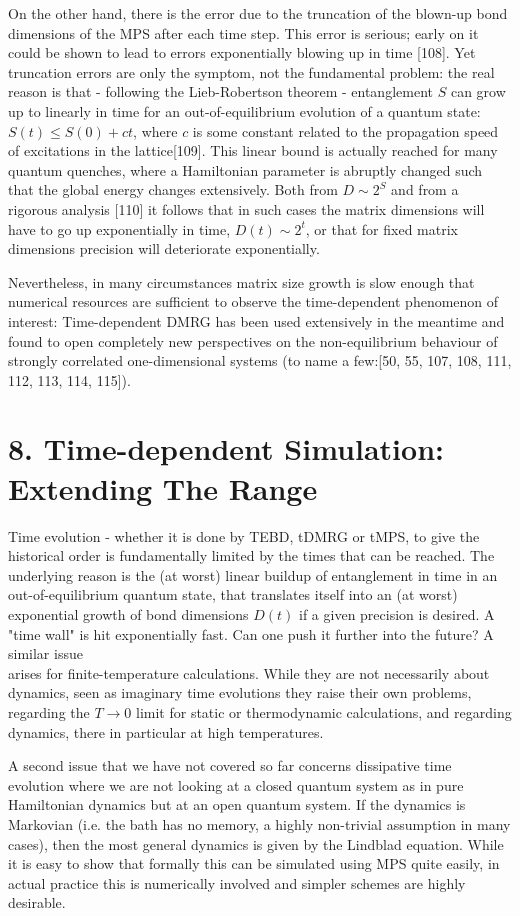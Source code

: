 \documentclass[12pt]{article}
\begin{document}
On the other hand, there is the error due to the truncation of the blown-up bond dimensions of the MPS after each time step. This error is serious; early on it could be shown to lead to errors exponentially blowing up in time [108]. Yet truncation errors are only the symptom, not the fundamental problem: the real reason is that - following the Lieb-Robertson theorem - entanglement $S$ can grow up to linearly in time for an out-of-equilibrium evolution of a quantum state: $S(t) \leq S(0)+c t$, where $c$ is some constant related to the propagation speed of excitations in the lattice[109]. This linear bound is actually reached for many quantum quenches, where a Hamiltonian parameter is abruptly changed such that the global energy changes extensively. Both from $D \sim 2^{S}$ and from a rigorous analysis [110] it follows that in such cases the matrix dimensions will have to go up exponentially in time, $D(t) \sim 2^{t}$, or that for fixed matrix dimensions precision will deteriorate exponentially.

Nevertheless, in many circumstances matrix size growth is slow enough that numerical resources are sufficient to observe the time-dependent phenomenon of interest: Time-dependent DMRG has been used extensively in the meantime and found to open completely new perspectives on the non-equilibrium behaviour of strongly correlated one-dimensional systems (to name a few:[50, 55, 107, 108, 111, 112, 113, 114, 115]).

\section*{8. Time-dependent Simulation: Extending The Range}
Time evolution - whether it is done by TEBD, tDMRG or tMPS, to give the historical order is fundamentally limited by the times that can be reached. The underlying reason is the (at worst) linear buildup of entanglement in time in an out-of-equilibrium quantum state, that translates itself into an (at worst) exponential growth of bond dimensions $D(t)$ if a given precision is desired. A "time wall" is hit exponentially fast. Can one push it further into the future? A similar issue\\
arises for finite-temperature calculations. While they are not necessarily about dynamics, seen as imaginary time evolutions they raise their own problems, regarding the $T \rightarrow 0$ limit for static or thermodynamic calculations, and regarding dynamics, there in particular at high temperatures.

A second issue that we have not covered so far concerns dissipative time evolution where we are not looking at a closed quantum system as in pure Hamiltonian dynamics but at an open quantum system. If the dynamics is Markovian (i.e. the bath has no memory, a highly non-trivial assumption in many cases), then the most general dynamics is given by the Lindblad equation. While it is easy to show that formally this can be simulated using MPS quite easily, in actual practice this is numerically involved and simpler schemes are highly desirable.
\end{document}
